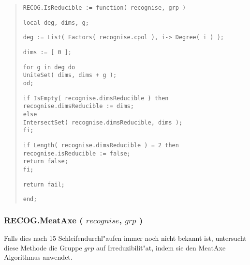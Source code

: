 \documentclass[a4paper,11pt]{article}
\theoremstyle{bla}
\begin{document}
\begin{quote}
\hspace*{-0.3cm} \texttt{RECOG.IsReducible := function( recognise, grp )}

  \texttt{local deg, dims, g;}

  \texttt{deg := List( Factors( recognise.cpol ), i-> Degree( i ) );}

  \texttt{dims := [ 0 ];}

  \texttt{for g in deg do}\\
    \hspace*{0.3cm} \texttt{UniteSet( dims, dims + g );}\\
  \texttt{od;}

  \texttt{if IsEmpty( recognise.dimsReducible ) then}\\
     \hspace*{0.3cm} \texttt{recognise.dimsReducible := dims;}\\
  \texttt{else}\\
     \hspace*{0.3cm} \texttt{IntersectSet( recognise.dimsReducible, dims );}\\
  \texttt{fi;}

  \texttt{if Length( recognise.dimsReducible ) = 2 then}\\
    \hspace*{0.3cm} \texttt{recognise.isReducible := false;}\\
    \hspace*{0.3cm} \texttt{return false;}\\
  \texttt{fi;}

  \texttt{return fail;}

\hspace*{-0.3cm} \texttt{end;}
\end{quote}


\subsubsection{RECOG.MeatAxe ( $recognise$, $grp$ )}\label{meat}

Falls dies nach 15 Schleifendurchl"aufen immer noch nicht bekannt ist, untersucht diese Methode die Gruppe $grp$ auf Irreduzibilit"at, indem sie den MeatAxe Algorithmus anwendet.
\end{document}

